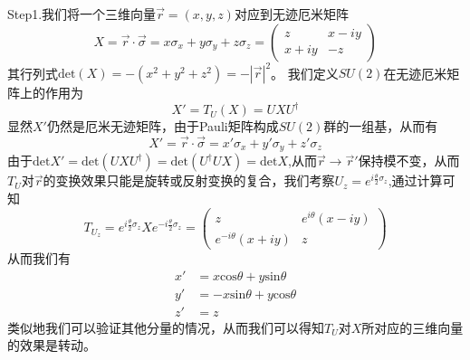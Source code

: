 Step1.我们将一个三维向量$\vec{r}=(x,y,z)$对应到无迹厄米矩阵
\begin{equation}
\label{chap4step1}
    X=\vec{r}\cdot\vec{\sigma}=x\sigma_{x}+y\sigma_{y}+z\sigma_{z}=\left(\begin{array}{cc}
        z & x-iy \\
        x+iy & -z
    \end{array}\right)
\end{equation}
其行列式$\text{det}(X)=-(x^{2}+y^{2}+z^{2})=-|\vec{r}|^{2}$。
我们定义$SU(2)$在无迹厄米矩阵上的作用为
\begin{equation}
    X'=T_{U}(X)=UXU^{\dagger}
\end{equation}
显然$X'$仍然是厄米无迹矩阵，由于Pauli矩阵构成$SU(2)$群的一组基，从而有
\begin{equation}
    X'=\vec{r}\cdot\vec{\sigma}=x'\sigma_{x}+y'\sigma_{y}+z'\sigma_{z}
\end{equation}
由于$\text{det}X'=\text{det}(UXU^{\dagger})=\text{det}(U^{\dagger}UX)=\text{det}X$,从而$\vec{r}\longrightarrow \vec{r}'$保持模不变，从而$T_{U}$对$\vec{r}$的变换效果只能是旋转或反射变换的复合，我们考察$U_{z}=e^{i\frac{\theta}{2}\sigma_{z}}$,通过计算可知
\begin{equation}
    T_{U_{z}}=e^{i\frac{\theta}{2}\sigma_{z}}Xe^{-i\frac{\theta}{2}\sigma_{z}}=\left(
    \begin{array}{cc}
        z & e^{i\theta}(x-iy) \\
        e^{-i\theta}(x+iy) & z
    \end{array}\right)
\end{equation}
从而我们有
\begin{equation}
    \begin{aligned}
    x'&=x\text{cos}\theta+y\text{sin}\theta\\
     y'&=-x\text{sin}\theta+y\text{cos}\theta\\
     z'&=z
    \end{aligned}
\end{equation}
类似地我们可以验证其他分量的情况，从而我们可以得知$T_{U}$对$X$所对应的三维向量的效果是转动。


